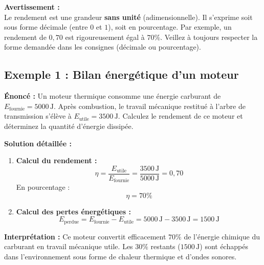 \documentclass[11pt,openany]{book}
\begin{document}
\vspace{0.3cm}

\noindent\textbf{Avertissement :} \\
Le rendement est une grandeur \textbf{sans unité} (adimensionnelle). Il s'exprime soit sous forme décimale (entre $0$ et $1$), soit en pourcentage. Par exemple, un rendement de $0{,}70$ est rigoureusement égal à $70\%$. Veillez à toujours respecter la forme demandée dans les consignes (décimale ou pourcentage).

\subsection*{Exemple 1 : Bilan énergétique d'un moteur}

\noindent\textbf{Énoncé :} Un moteur thermique consomme une énergie carburant de $E_{\mathrm{fournie}} = \mathrm{5000\,J}$. Après combustion, le travail mécanique restitué à l'arbre de transmission s'élève à $E_{\mathrm{utile}} = \mathrm{3500\,J}$. Calculez le rendement de ce moteur et déterminez la quantité d'énergie dissipée.

\vspace{0.2cm}

\noindent\textbf{Solution détaillée :}

\begin{enumerate}
    \item \textbf{Calcul du rendement :}
    \[
    \eta = \frac{E_{\mathrm{utile}}}{E_{\mathrm{fournie}}} = \frac{3500\,\mathrm{J}}{5000\,\mathrm{J}} = 0{,}70
    \]
    En pourcentage :
    \[
    \boxed{\eta = 70\%}
    \]

    \item \textbf{Calcul des pertes énergétiques :}
    \[
    E_{\mathrm{perdue}} = E_{\mathrm{fournie}} - E_{\mathrm{utile}} = 5000\,\mathrm{J} - 3500\,\mathrm{J} = \mathrm{1500\,J}
    \]
\end{enumerate}

\noindent\textbf{Interprétation :} Ce moteur convertit efficacement $70\%$ de l'énergie chimique du carburant en travail mécanique utile. Les $30\%$ restants ($\mathrm{1500\,J}$) sont échappés dans l'environnement sous forme de chaleur thermique et d'ondes sonores.

\vspace{0.4cm}

\end{document}
